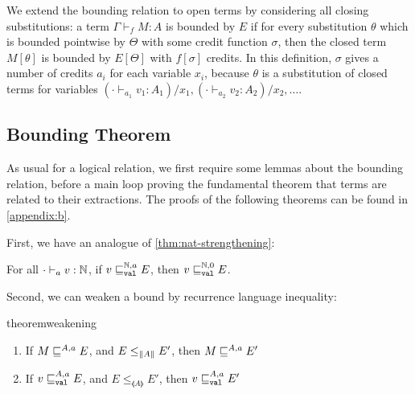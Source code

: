 We extend the bounding relation to open terms by considering all closing
substitutions: a term $\Gamma \vdash_f M : A$ is bounded by $E$ if for
every substitution $\theta$ which is bounded pointwise by $\Theta$ with
some credit function $\sigma$, then the closed term $M[\theta]$ is
bounded by $E[\Theta]$ with $f[\sigma]$ credits.  In this definition,
$\sigma$ gives a number of credits $a_i$ for each variable $x_i$,
because $\theta$ is a substitution of closed terms for variables $(\cdot
\vdash_{a_1} v_1 : A_1) / x_1, (\cdot \vdash_{a_2} v_2 : A_2) / x_2,
\ldots$.

\subsection{Bounding Theorem}

As usual for a logical relation, we first require some lemmas about the
bounding relation, before a main loop proving the fundamental theorem
that terms are related to their extractions.  The proofs of the following
theorems can be found
in \autoref{appendix:b}.%

First, we have an analogue of \autoref{thm:nat-strengthening}:

\begin{theorem}[$\N$-strengthening]
For all $\cdot \vdash_a v : \mathbb{N}$, if $v \sqsubseteq_{\texttt{val}}^{\mathbb{N},a} E$, then $v \sqsubseteq_{\texttt{val}}^{\mathbb{N},0} E$.
\end{theorem}

Second, we can weaken a bound by recurrence language inequality:

\begin{restatable}[Weakening]{theorem}{weakening} \hfill
\label{thm:weakening}
\begin{enumerate}
    \item If $M \sqsubseteq^{A,a} E$, and $E \leq_{\left\lVert A\right\rVert} E'$, then $M \sqsubseteq^{A,a} E'$
    \item If $v \sqsubseteq_{\texttt{val}}^{A,a} E$, and $E \leq_{\llangle A \rrangle} E'$, then $v \sqsubseteq_{\texttt{val}}^{A,a} E'$
\end{enumerate}
\end{restatable}

